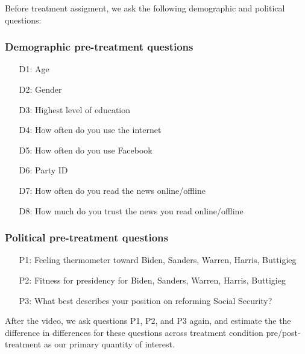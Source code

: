 Before treatment assigment, we ask the following demographic and political questions:

\subsubsection{Demographic pre-treatment questions}
{  
  \begin{itemize}
  \item[D1:] Age
  \item[D2:] Gender
  \item[D3:] Highest level of education
  \item[D4:] How often do you use the internet
  \item[D5:] How often do you use Facebook
  \item[D6:] Party ID
  \item[D7:] How often do you read the news online/offline
  \item[D8:] How much do you trust the news you read online/offline
  \end{itemize}
}

\subsubsection{Political pre-treatment questions}
{  
  \begin{itemize}
  \item[P1:] Feeling thermometer toward Biden, Sanders, Warren, Harris, Buttigieg
  \item[P2:] Fitness for presidency for Biden, Sanders, Warren, Harris, Buttigieg
  \item[P3:] What best describes your position on reforming Social Security?
  \end{itemize}
}

After the video, we ask questions P1, P2, and P3 again, and estimate
the the difference in differences for these questions across treatment
condition pre/post-treatment as our primary quantity of interest.
